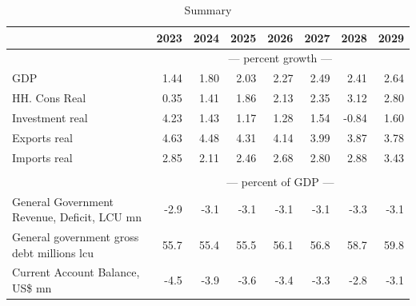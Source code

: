 \documentclass{article}
\begin{document}
\begin{table}[ht]
\caption{Summary}
\begin{tabular}{lrrrrrrr}
\toprule
 & 2023 & 2024 & 2025 & 2026 & 2027 & 2028 & 2029 \\
\midrule
&\multicolumn{7}{c}{--- percent growth ---}                                                                                                                                             \\
GDP & 1.44 & 1.80 & 2.03 & 2.27 & 2.49 & 2.41 & 2.64 \\
HH. Cons Real & 0.35 & 1.41 & 1.86 & 2.13 & 2.35 & 3.12 & 2.80 \\
Investment real & 4.23 & 1.43 & 1.17 & 1.28 & 1.54 & -0.84 & 1.60 \\
Exports real & 4.63 & 4.48 & 4.31 & 4.14 & 3.99 & 3.87 & 3.78 \\
Imports real & 2.85 & 2.11 & 2.46 & 2.68 & 2.80 & 2.88 & 3.43 \\
&\multicolumn{7}{c}{  }                                                                                                                                             \\
&\multicolumn{7}{c}{--- percent of GDP ---}                                                                                                                                             \\
General Government Revenue, Deficit, LCU mn & -2.9 & -3.1 & -3.1 & -3.1 & -3.1 & -3.3 & -3.1 \\
General government gross debt millions lcu & 55.7 & 55.4 & 55.5 & 56.1 & 56.8 & 58.7 & 59.8 \\
Current Account Balance, US\$ mn & -4.5 & -3.9 & -3.6 & -3.4 & -3.3 & -2.8 & -3.1 \\
\bottomrule
\end{tabular}
\end{table}
\end{document}
